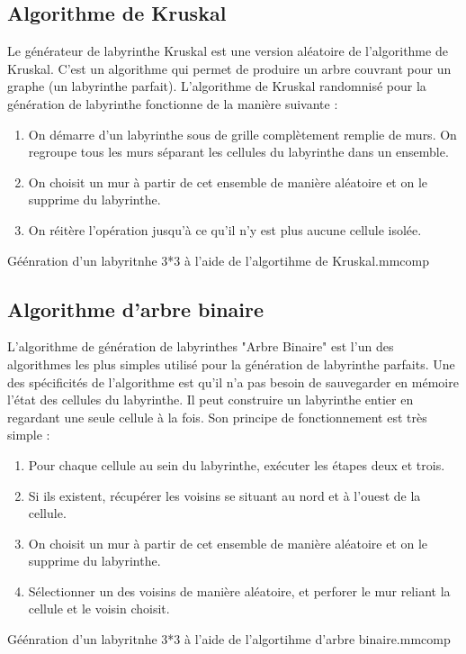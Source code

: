 \subsection{Algorithme de Kruskal}
Le générateur de labyrinthe Kruskal est une version aléatoire de l'algorithme de Kruskal. C'est un algorithme qui permet de produire un arbre couvrant pour un graphe (un labyrinthe parfait).
L'algorithme de Kruskal randomnisé pour la génération de labyrinthe fonctionne de la manière suivante :
\newline
\begin{enumerate}
    \item On démarre d'un labyrinthe sous de grille complètement remplie de murs. On regroupe tous les murs séparant les cellules du labyrinthe dans un ensemble.
    \item On choisit un mur à partir de cet ensemble de manière aléatoire et on le supprime du labyrinthe.
    \item On réitère l'opération jusqu'à ce qu'il n'y est plus aucune cellule isolée.
\end{enumerate}
{Géénration d'un labyritnhe 3*3 à l'aide de l'algortihme de Kruskal.}{mmcomp}


\subsection{Algorithme d'arbre binaire}
L'algorithme de génération de labyrinthes "Arbre Binaire" est l'un des algorithmes les plus simples utilisé pour la génération de labyrinthe parfaits. Une des spécificités de l'algorithme est qu'il n'a pas besoin de sauvegarder en mémoire l'état des cellules du labyrinthe. Il peut construire un labyrinthe entier en regardant une seule cellule à la fois.
Son principe de fonctionnement est très simple :
\newpage
\begin{enumerate}
    \item Pour chaque cellule au sein du labyrinthe, exécuter les étapes deux et trois.
    \item Si ils existent, récupérer les voisins se situant au nord et à l'ouest de la cellule.
    \item On choisit un mur à partir de cet ensemble de manière aléatoire et on le supprime du labyrinthe.
    \item Sélectionner un des voisins de manière aléatoire, et perforer le mur reliant la cellule et le voisin choisit.
\end{enumerate}
\newline
{}
{Géénration d'un labyritnhe 3*3 à l'aide de l'algortihme d'arbre binaire.}{mmcomp}



